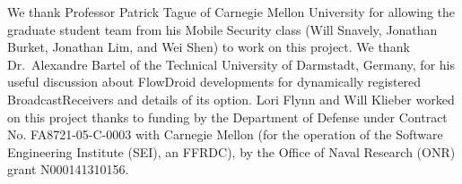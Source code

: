 \begin{acknowledgments}
We thank Professor Patrick Tague of Carnegie Mellon University for allowing the graduate student team from his Mobile Security class (Will Snavely, Jonathan Burket, Jonathan Lim, and Wei Shen) to work on this project. We thank Dr.\ Alexandre Bartel of the Technical University of Darmstadt, Germany, for his useful discussion about FlowDroid developments for dynamically registered BroadcastReceivers and details of its  option. Lori Flynn and Will Klieber worked on this project thanks to funding by the Department of Defense under Contract No. FA8721-05-C-0003 with Carnegie Mellon (for the operation of the Software Engineering Institute (SEI), an FFRDC), by the Office of Naval Research (ONR) grant N000141310156.
\end{acknowledgments}
